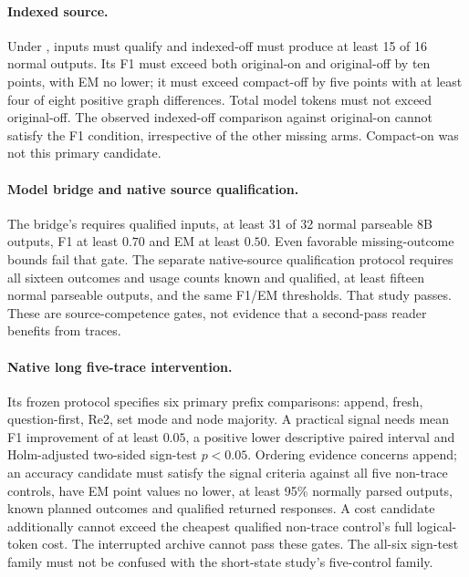\paragraph{Indexed source.} Under \protect{}, inputs must qualify and indexed-off must produce at least 15 of 16 normal outputs. Its F1 must exceed both original-on and original-off by ten points, with EM no lower; it must exceed compact-off by five points with at least four of eight positive graph differences. Total model tokens must not exceed original-off. The observed indexed-off comparison against original-on cannot satisfy the F1 condition, irrespective of the other missing arms. Compact-on was not this primary candidate.

\paragraph{Model bridge and native source qualification.} The bridge's \protect{} requires qualified inputs, at least 31 of 32 normal parseable 8B outputs, F1 at least $0.70$ and EM at least $0.50$. Even favorable missing-outcome bounds fail that gate. The separate native-source qualification protocol requires all sixteen outcomes and usage counts known and qualified, at least fifteen normal parseable outputs, and the same F1/EM thresholds. That study passes. These are source-competence gates, not evidence that a second-pass reader benefits from traces.

\paragraph{Native long five-trace intervention.} Its frozen protocol specifies six primary prefix comparisons: append, fresh, question-first, Re2, set mode and node majority. A practical signal needs mean F1 improvement of at least $0.05$, a positive lower descriptive paired interval and Holm-adjusted two-sided sign-test $p<0.05$. Ordering evidence concerns append; an accuracy candidate must satisfy the signal criteria against all five non-trace controls, have EM point values no lower, at least 95\% normally parsed outputs, known planned outcomes and qualified returned responses. A cost candidate additionally cannot exceed the cheapest qualified non-trace control's full logical-token cost. The interrupted archive cannot pass these gates. The all-six sign-test family must not be confused with the short-state study's five-control family.

